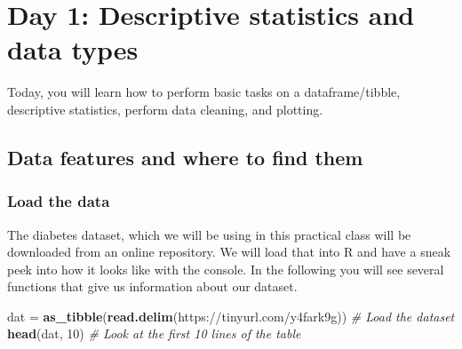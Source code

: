 \documentclass[
]{book}
\newenvironment{Shaded}{\begin{snugshade}}{\end{snugshade}}
\newcommand{\CommentTok}[1]{\textcolor[rgb]{0.56,0.35,0.01}{\textit{#1}}}
\newcommand{\DecValTok}[1]{\textcolor[rgb]{0.00,0.00,0.81}{#1}}
\newcommand{\FunctionTok}[1]{\textcolor[rgb]{0.13,0.29,0.53}{\textbf{#1}}}
\newcommand{\NormalTok}[1]{#1}
\newcommand{\OtherTok}[1]{\textcolor[rgb]{0.56,0.35,0.01}{#1}}
\newcommand{\StringTok}[1]{\textcolor[rgb]{0.31,0.60,0.02}{#1}}
\begin{document}
\hypertarget{day-1-descriptive-statistics-and-data-types}{%
\section*{Day 1: Descriptive statistics and data types}\label{day-1-descriptive-statistics-and-data-types}}

Today, you will learn how to perform basic tasks on a dataframe/tibble, descriptive statistics, perform data cleaning, and plotting.

\hypertarget{data-features-and-where-to-find-them}{%
\subsection{Data features and where to find them}\label{data-features-and-where-to-find-them}}

\hypertarget{load-the-data}{%
\subsubsection{Load the data}\label{load-the-data}}

The diabetes dataset, which we will be using in this practical class will be downloaded from an online repository.
We will load that into R and have a sneak peek into how it looks like with the console.
In the following you will see several functions that give us information about our dataset.

\begin{Shaded}
\begin{Highlighting}[]
\NormalTok{dat }\OtherTok{=} \FunctionTok{as\_tibble}\NormalTok{(}\FunctionTok{read.delim}\NormalTok{(}\StringTok{\textquotesingle{}https://tinyurl.com/y4fark9g\textquotesingle{}}\NormalTok{)) }\CommentTok{\# Load the dataset}
\FunctionTok{head}\NormalTok{(dat, }\DecValTok{10}\NormalTok{) }\CommentTok{\# Look at the first 10 lines of the table}
\end{Highlighting}
\end{Shaded}
\end{document}
